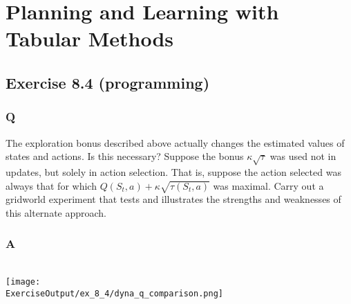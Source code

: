 \section{Planning and Learning with Tabular Methods}

\subsection{Exercise 8.4 (programming)}

\subsubsection{Q}
The exploration bonus described above actually changes the estimated values of states and actions. Is this necessary? Suppose the bonus $\kappa \sqrt{\tau}$ was used not in updates, but solely in action selection. That is, suppose the action selected was always that for which $Q(S_t, a) + \kappa \sqrt{\tau(S_t, a)}$ was maximal. Carry out a gridworld experiment that tests and illustrates the strengths and weaknesses of this alternate approach.

\subsubsection{A}
\ProgrammingExercise{}\\
\texttt{[image: \\ExerciseOutput/ex\_8\_4/dyna\_q\_comparison.png]}
